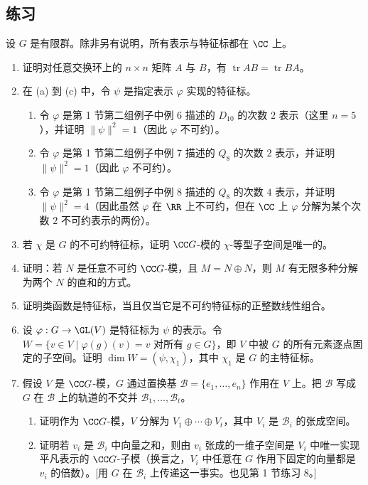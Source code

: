 \subsection*{练习}

设 $G$ 是有限群。除非另有说明，所有表示与特征标都在 $\CC$ 上。
\begin{enumerate}[label=\arabic*.]
  \item 证明对任意交换环上的 $n\times n$ 矩阵 $A$ 与 $B$，有 $\operatorname{tr}AB=\operatorname{tr}BA$。
  \item 在 (a) 到 (c) 中，令 $\psi$ 是指定表示 $\varphi$ 实现的特征标。
  \begin{enumerate}[label=(\alph*)]
    \item 令 $\varphi$ 是第 1 节第二组例子中例 6 描述的 $D_{10}$ 的次数 $2$ 表示（这里 $n=5$），并证明 $\|\psi\|^2=1$（因此 $\varphi$ 不可约）。
    \item 令 $\varphi$ 是第 1 节第二组例子中例 7 描述的 $Q_8$ 的次数 $2$ 表示，并证明 $\|\psi\|^2=1$（因此 $\varphi$ 不可约）。
    \item 令 $\varphi$ 是第 1 节第二组例子中例 8 描述的 $Q_8$ 的次数 $4$ 表示，并证明 $\|\psi\|^2=4$（因此虽然 $\varphi$ 在 $\RR$ 上不可约，但在 $\CC$ 上 $\varphi$ 分解为某个次数 $2$ 不可约表示的两份）。
  \end{enumerate}
  \item 若 $\chi$ 是 $G$ 的不可约特征标，证明 $\CC G$-模的 $\chi$-等型子空间是唯一的。
  \item 证明：若 $N$ 是任意不可约 $\CC G$-模，且 $M=N\oplus N$，则 $M$ 有无限多种分解为两个 $N$ 的直和的方式。
  \item 证明类函数是特征标，当且仅当它是不可约特征标的正整数线性组合。
  \item 设 $\varphi:G\to\GL(V)$ 是特征标为 $\psi$ 的表示。令 $W=\{v\in V\mid \varphi(g)(v)=v\text{ 对所有 }g\in G\}$，即 $V$ 中被 $G$ 的所有元素逐点固定的子空间。证明 $\dim W=(\psi,\chi_1)$，其中 $\chi_1$ 是 $G$ 的主特征标。
  \item 假设 $V$ 是 $\CC G$-模，$G$ 通过置换基 $\mathcal B=\{e_1,
  \ldots,e_n\}$ 作用在 $V$ 上。把 $\mathcal B$ 写成 $G$ 在 $\mathcal B$ 上的轨道的不交并 $\mathcal B_1,
  \ldots,\mathcal B_t$。
  \begin{enumerate}[label=(\alph*)]
    \item 证明作为 $\CC G$-模，$V$ 分解为 $V_1\oplus\cdots\oplus V_t$，其中 $V_i$ 是 $\mathcal B_i$ 的张成空间。
    \item 证明若 $v_i$ 是 $\mathcal B_i$ 中向量之和，则由 $v_i$ 张成的一维子空间是 $V_i$ 中唯一实现平凡表示的 $\CC G$-子模（换言之，$V_i$ 中任意在 $G$ 作用下固定的向量都是 $v_i$ 的倍数）。[用 $G$ 在 $\mathcal B_i$ 上传递这一事实。也见第 1 节练习 8。]

\end{enumerate}
\end{enumerate}
